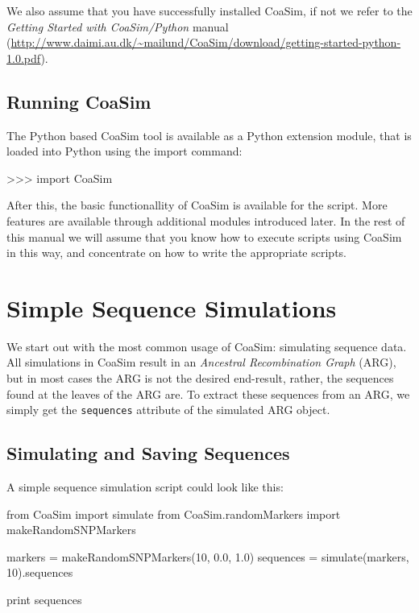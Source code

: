 \documentclass{manual}
\begin{document}
\begin{empfile}
We also assume that you have successfully installed CoaSim, if not we
refer to the \emph{Getting Started with CoaSim/Python} manual
(\url{http://www.daimi.au.dk/~mailund/CoaSim/download/getting-started-python-1.0.pdf}).


\subsection{Running CoaSim}
\label{sec:running-coasim}

The Python based CoaSim tool is available as a Python extension
module, that is loaded into Python using the import command:
\begin{code}
>>> import CoaSim
\end{code}
After this, the basic functionallity of CoaSim is available for the
script.  More features are available through additional modules
introduced later.  In the rest of this manual we will assume that you
know how to execute scripts using CoaSim in this way, and concentrate
on how to write the appropriate scripts.

\section{Simple Sequence Simulations}
\label{sec:simple-sequ-simul}

We start out with the most common usage of CoaSim: simulating sequence
data.  All simulations in CoaSim result in an \emph{Ancestral
  Recombination Graph} (ARG), but in most cases the ARG is not the
desired end-result, rather, the sequences found at the leaves of the
ARG are.  To extract these sequences from an ARG, we simply get the
\texttt{sequences} attribute of the simulated ARG object.

\subsection{Simulating and Saving Sequences}
\label{sec:simul-saving-sequ}


A simple sequence simulation script could look like this:
\begin{code}
from CoaSim import simulate
from CoaSim.randomMarkers import makeRandomSNPMarkers

markers = makeRandomSNPMarkers(10, 0.0, 1.0)
sequences = simulate(markers, 10).sequences

print sequences
\end{code}


\end{empfile}
\end{document}
